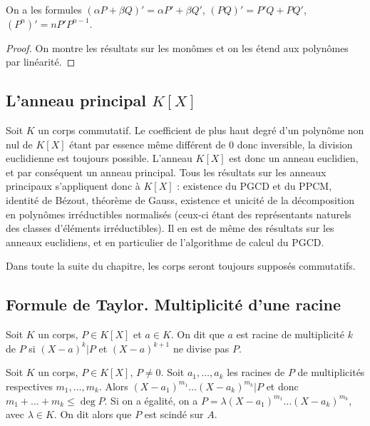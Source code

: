 \begin{prop}
On a les formules $(\alpha P + \beta Q)' = \alpha P' + \beta Q'$, $(PQ)' = P'Q + PQ'$, $(P^n)' = nP'P^{n-1}$.
\end{prop}

\begin{proof}
On montre les résultats sur les monômes et on les étend aux polynômes par linéarité.
\end{proof}

\subsection{L'anneau principal $K[X]$}

Soit $K$ un corps commutatif. Le coefficient de plus haut degré d'un polynôme non nul de $K[X]$ étant par essence même différent de 0 donc inversible, la division euclidienne est toujours possible. L'anneau $K[X]$ est donc un anneau euclidien, et par conséquent un anneau principal. Tous les résultats sur les anneaux principaux s'appliquent donc à $K[X]$ : existence du PGCD et du PPCM, identité de Bézout, théorème de Gauss, existence et unicité de la décomposition en polynômes irréductibles normalisés (ceux-ci étant des représentants naturels des classes d'éléments irréductibles). Il en est de même des résultats sur les anneaux euclidiens, et en particulier de l'algorithme de calcul du PGCD.

Dans toute la suite du chapitre, les corps seront toujours supposés commutatifs.

\subsection{Formule de Taylor. Multiplicité d'une racine}

\begin{de}
Soit $K$ un corps, $P \in K[X]$ et $a \in K$. On dit que $a$ est racine de multiplicité $k$ de $P$ si $(X - a)^k | P$ et $(X - a)^{k+1}$ ne divise pas $P$.
\end{de}

\begin{prop}
Soit $K$ un corps, $P \in K[X]$, $P \neq 0$. Soit $a_1,\ldots,a_k$ les racines de $P$ de multiplicités respectives $m_1,\ldots,m_k$. Alors $(X - a_1)^{m_1}\ldots(X - a_k)^{m_k} | P$ et donc $m_1 + \ldots + m_k \leq \deg P$. Si on a égalité, on a $P = \lambda(X - a_1)^{m_1}\ldots(X - a_k)^{m_k}$, avec $\lambda \in K$. On dit alors que $P$ est scindé sur $A$.
\end{prop}

